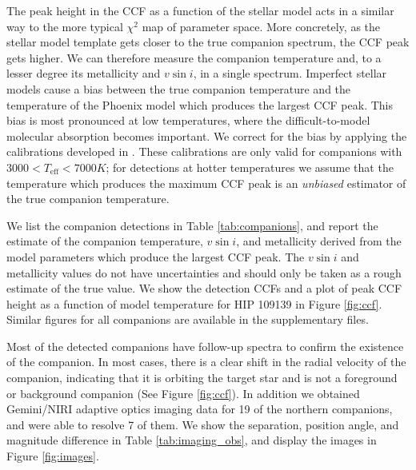 \documentclass{emulateapj}
\begin{document}
The peak height in the CCF as a function of the stellar model acts in a similar way to the more typical $\chi^2$ map of parameter space. More concretely, as the stellar model template gets closer to the true companion spectrum, the CCF peak gets higher. We can therefore measure the companion temperature and, to a lesser degree its metallicity and $v\sin{i}$, in a single spectrum. Imperfect stellar models cause a bias between the true companion temperature and the temperature of the Phoenix model which produces the largest CCF peak. This bias is most pronounced at low temperatures, where the difficult-to-model molecular absorption becomes important. We correct for the bias by applying the calibrations developed in \citet{Gullikson2016}. These calibrations are only valid for companions with $3000 < T_\mathrm{eff} < 7000 K$; for detections at hotter temperatures we assume that the temperature which produces the maximum CCF peak is an \emph{unbiased} estimator of the true companion temperature.

We list the companion detections in Table \ref{tab:companions}, and report the estimate of the companion temperature, $v\sin{i}$, and metallicity derived from the model parameters which produce the largest CCF peak. The $v\sin{i}$ and metallicity values do not have uncertainties and should only be taken as a rough estimate of the true value. We show the detection CCFs and a plot of peak CCF height as a function of model temperature for HIP 109139 in Figure \ref{fig:ccf}. Similar figures for all companions are available in the supplementary files.


Most of the detected companions have follow-up spectra to confirm the existence of the companion. In most cases, there is a clear shift in the radial velocity of the companion, indicating that it is orbiting the target star and is not a foreground or background companion (See Figure \ref{fig:ccf}). In addition we obtained Gemini/NIRI adaptive optics imaging data for 19 of the northern companions, and were able to resolve 7 of them. We show the separation, position angle, and magnitude difference in Table \ref{tab:imaging_obs}, and display the images in Figure \ref{fig:images}.
\end{document}
